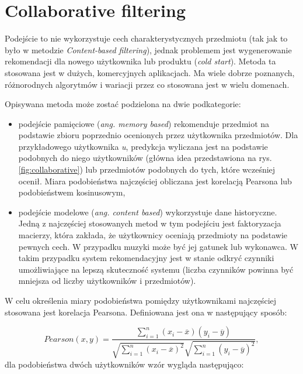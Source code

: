 \section{Collaborative filtering}

Podejście to nie wykorzystuje cech charakterystycznych przedmiotu (tak jak to było w metodzie \textit{Content-based filtering}), jednak problemem jest wygenerowanie rekomendacji dla nowego użytkownika lub produktu (\textit{cold start}). Metoda ta stosowana jest w dużych, komercyjnych aplikacjach. Ma wiele dobrze poznanych, różnorodnych algorytmów i wariacji przez co stosowana jest w wielu domenach.

Opisywana metoda może zostać podzielona na dwie podkategorie:

\begin{itemize}
    \item podejście pamięciowe (\textit{ang. memory based}) rekomenduje przedmiot na podstawie zbioru poprzednio ocenionych przez użytkownika przedmiotów. Dla przykładowego użytkownika \textit{u}, predykcja wyliczana jest na podstawie podobnych do niego użytkowników (główna idea przedstawiona na rys. \ref{fig:collaborative}) lub przedmiotów podobnych do tych, które wcześniej ocenił. Miara podobieństwa najczęściej obliczana jest korelacją Pearsona lub podobieństwem kosinusowym,
    \item podejście modelowe (\textit{ang. content based}) wykorzystuje dane historyczne. Jedną z najczęściej stosowanych metod w tym podejściu jest faktoryzacja macierzy, która zakłada, że użytkownicy oceniają przedmioty na podstawie pewnych cech. W przypadku muzyki może być jej gatunek lub wykonawca. W takim przypadku system rekomendacyjny jest w stanie odkryć czynniki umożliwiające na lepszą skuteczność systemu (liczba czynników powinna być mniejsza od liczby użytkowników i przedmiotów). 
\end{itemize}

W celu określenia miary podobieństwa pomiędzy użytkownikami najczęściej stosowana jest korelacja Pearsona. Definiowana jest ona w następujący sposób:

\begin{equation}
Pearson(x,y) = \frac{\sum\limits_{i=1}^n(x_i - \overline{x})(y_i - \overline{y})}{\sqrt{\sum\limits_{i=1}^n(x_i - \overline{x})^2}\sqrt{\sum\limits_{i=1}^n(y_i - \overline{y})^2}},
\end{equation}
dla podobieństwa dwóch użytkowników wzór wygląda następująco:

